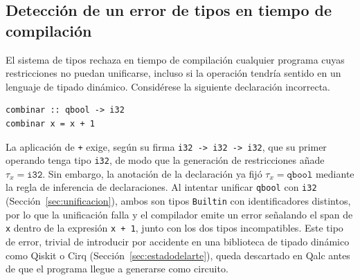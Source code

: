 \subsection{Detección de un error de tipos en tiempo de compilación}

El sistema de tipos rechaza en tiempo de compilación cualquier programa cuyas restricciones no puedan unificarse, incluso si la operación tendría sentido en un lenguaje de tipado dinámico. Considérese la siguiente declaración incorrecta.

\begin{lstlisting}[language={}, caption=Declaración que produce un error de unificación entre qbool e i32]
combinar :: qbool -> i32
combinar x = x + 1
\end{lstlisting}

La aplicación de \lstinline|+| exige, según su firma \lstinline|i32 -> i32 -> i32|, que su primer operando tenga tipo \lstinline|i32|, de modo que la generación de restricciones añade $\tau_x = \mathtt{i32}$. Sin embargo, la anotación de la declaración ya fijó $\tau_x = \mathtt{qbool}$ mediante la regla de inferencia de declaraciones. Al intentar unificar \lstinline|qbool| con \lstinline|i32| (Sección~\ref{sec:unificacion}), ambos son tipos \lstinline|Builtin| con identificadores distintos, por lo que la unificación falla y el compilador emite un error señalando el span de \lstinline|x| dentro de la expresión \lstinline|x + 1|, junto con los dos tipos incompatibles. Este tipo de error, trivial de introducir por accidente en una biblioteca de tipado dinámico como Qiskit o Cirq (Sección~\ref{sec:estadodelarte}), queda descartado en Qalc antes de que el programa llegue a generarse como circuito.
